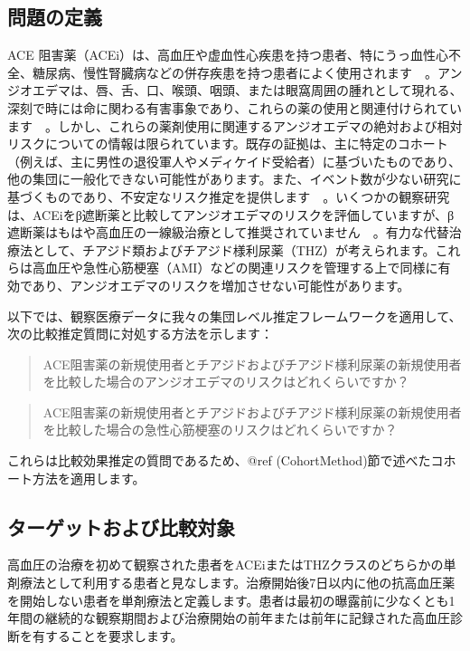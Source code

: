 \documentclass[
  11pt]{book}
\theoremstyle{definition}
\theoremstyle{definition}
\theoremstyle{definition}
\theoremstyle{definition}
\theoremstyle{remark}
\begin{document}
\subsection{問題の定義}\label{ux554fux984cux306eux5b9aux7fa9-1}

ACE 阻害薬（ACEi）は、高血圧や虚血性心疾患を持つ患者、特にうっ血性心不全、糖尿病、慢性腎臓病などの併存疾患を持つ患者によく使用されます　\citep[ ]{zaman_2002}。アンジオエデマは、唇、舌、口、喉頭、咽頭、または眼窩周囲の腫れとして現れる、深刻で時には命に関わる有害事象であり、これらの薬の使用と関連付けられています　\citep{sabroe_1997}。しかし、これらの薬剤使用に関連するアンジオエデマの絶対および相対リスクについての情報は限られています。既存の証拠は、主に特定のコホート（例えば、主に男性の退役軍人やメディケイド受給者）に基づいたものであり、他の集団に一般化できない可能性があります。また、イベント数が少ない研究に基づくものであり、不安定なリスク推定を提供します　\citep[ ]{powers_2012}。いくつかの観察研究は、ACEiをβ遮断薬と比較してアンジオエデマのリスクを評価しています\citep[ ]{magid_2010, toh_2012}が、β遮断薬はもはや高血圧の一線級治療として推奨されていません　\citep[ ]{whelton_2018}。有力な代替治療法として、チアジド類およびチアジド様利尿薬（THZ）が考えられます。これらは高血圧や急性心筋梗塞（AMI）などの関連リスクを管理する上で同様に有効であり、アンジオエデマのリスクを増加させない可能性があります。

以下では、観察医療データに我々の集団レベル推定フレームワークを適用して、次の比較推定質問に対処する方法を示します：

\begin{quote}
ACE阻害薬の新規使用者とチアジドおよびチアジド様利尿薬の新規使用者を比較した場合のアンジオエデマのリスクはどれくらいですか？
\end{quote}

\begin{quote}
ACE阻害薬の新規使用者とチアジドおよびチアジド様利尿薬の新規使用者を比較した場合の急性心筋梗塞のリスクはどれくらいですか？
\end{quote}

これらは比較効果推定の質問であるため、@ref (CohortMethod)節で述べたコホート方法を適用します。

\subsection{ターゲットおよび比較対象}\label{ux30bfux30fcux30b2ux30c3ux30c8ux304aux3088ux3073ux6bd4ux8f03ux5bfeux8c61}

高血圧の治療を初めて観察された患者をACEiまたはTHZクラスのどちらかの単剤療法として利用する患者と見なします。治療開始後7日以内に他の抗高血圧薬を開始しない患者を単剤療法と定義します。患者は最初の曝露前に少なくとも1年間の継続的な観察期間および治療開始の前年または前年に記録された高血圧診断を有することを要求します。
\end{document}
